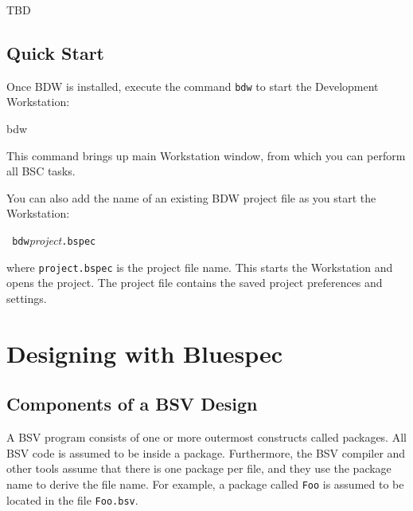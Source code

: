 \documentclass{article}
\newcommand{\te}[1]{\texttt{#1}}
\newenvironment{smbox}[1][2.5 in]
  {\begin{lrbox}{\fminibox}\begin{minipage}[c]{2.5 in}}
  {\end{minipage}\end{lrbox}\fbox{\usebox{\fminibox}}}
\newenvironment{centerboxverbatim}
  {\center
   \boxedverbatim}
  {\endboxedverbatim
  {\endcenter }}
\begin{document}
TBD


\subsection{Quick Start}

Once BDW is installed,
execute the command \te{bdw} to start the Development Workstation:

\begin{centerboxverbatim}
bdw
\end{centerboxverbatim}

This command brings up main Workstation window, from which you can perform
all BSC tasks.

You can also add the name of an existing BDW project file as you start
the Workstation:

\begin{center}
\begin{smbox}
{\tt \hspace*{2em} bdw}\hspace*{2em}\emph{project}{\tt .bspec}
\end{smbox}
\end{center}

where \te{project.bspec} is the project file name.  This
starts the Workstation and opens the project.  The project file contains
the saved project preferences and settings.


\section{Designing with Bluespec}


\subsection{Components of a BSV Design}

A BSV program consists of one or more outermost constructs called
packages.  All BSV code is assumed to be inside a package.  Furthermore, the
BSV compiler and other tools assume that there is one package per
file, and they use the package name to derive the file name.  For
example, a package called \texttt{Foo} is assumed to be located in the file
\texttt{Foo.bsv}.
\end{document}
